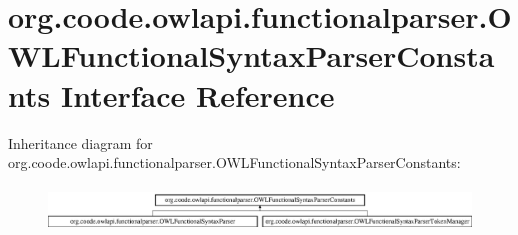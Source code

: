 \hypertarget{interfaceorg_1_1coode_1_1owlapi_1_1functionalparser_1_1_o_w_l_functional_syntax_parser_constants}{\section{org.\-coode.\-owlapi.\-functionalparser.\-O\-W\-L\-Functional\-Syntax\-Parser\-Constants Interface Reference}
\label{interfaceorg_1_1coode_1_1owlapi_1_1functionalparser_1_1_o_w_l_functional_syntax_parser_constants}
}
Inheritance diagram for org.\-coode.\-owlapi.\-functionalparser.\-O\-W\-L\-Functional\-Syntax\-Parser\-Constants\-:\begin{figure}[H]
\begin{center}
\leavevmode
\includegraphics[height=1.201717cm]{interfaceorg_1_1coode_1_1owlapi_1_1functionalparser_1_1_o_w_l_functional_syntax_parser_constants}
\end{center}
\end{figure}
